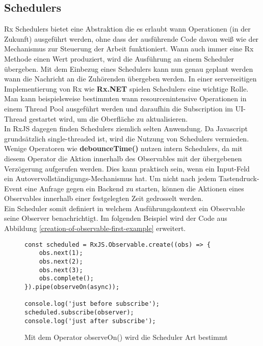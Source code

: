 \subsection{Schedulers}

Rx Schedulers bietet eine Abstraktion die es erlaubt wann Operationen (in der Zukunft) ausgeführt werden, ohne dass der ausführende Code davon weiß wie der Mechanismus zur Steuerung der Arbeit funktioniert. Wann auch immer eine Rx Methode einen Wert produziert, wird die Ausführung an einem Scheduler übergeben. Mit dem Einbezug eines Schedulers kann nun genau geplant werden wann die Nachricht an die Zuhörenden übergeben werden. In einer serverseitigen Implementierung von Rx wie \textbf{Rx.NET} spielen Schedulers eine wichtige Rolle. Man kann beispielsweise bestimmten wann resourcenintensive Operationen in einem Thread Pool ausgeführt werden und daraufhin die Subscription im UI-Thread gestartet wird, um die Oberfläche zu aktualisieren.\\

\noindent
In RxJS dagegen finden Schedulers ziemlich selten Anwendung. Da Javascript grundsätzlich single-threaded ist, wird die Nutzung von Schedulers vermieden. Wenige Operatoren wie \textbf{debounceTime()} nutzen intern Schedulers, da mit diesem Operator die Aktion innerhalb des Observables mit der übergebenen Verzögerung aufgerufen werden. Dies kann praktisch sein, wenn ein Input-Feld ein Autovervollständigungs-Mechanismus hat. Um nicht nach jedem Tastendruck-Event eine Anfrage gegen ein Backend zu starten, können die Aktionen eines Observables innerhalb einer festgelegten Zeit gedrosselt werden.\\

\noindent
Ein Scheduler somit definiert in welchem Ausführungskontext ein Observable seine Observer benachrichtigt. Im folgenden Beispiel wird der Code aus Abbildung \ref{creation-of-observable-first-example} erweitert.

\begin{figure}[H]
\begin{lstlisting}[basicstyle=\small]
const scheduled = RxJS.Observable.create((obs) => {
    obs.next(1);
    obs.next(2);
    obs.next(3);
    obs.complete();
}).pipe(observeOn(async));

console.log('just before subscribe');
scheduled.subscribe(observer);
console.log('just after subscribe');
\end{lstlisting}
\caption{Mit dem Operator observeOn() wird die Scheduler Art bestimmt}
\end{figure}

